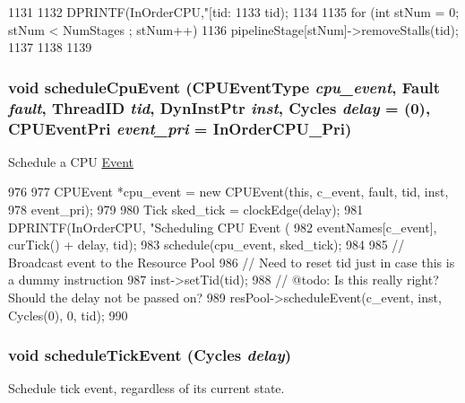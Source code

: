 \begin{DoxyCode}
1131 {
1132     DPRINTF(InOrderCPU,"[tid:%
1133             tid);
1134 
1135     for (int stNum = 0; stNum < NumStages ; stNum++) {
1136         pipelineStage[stNum]->removeStalls(tid);
1137     }
1138 
1139 }
\end{DoxyCode}
\hypertarget{classInOrderCPU_a7b7130cac388c6a2fd896ba0f6b7b87a}{
\subsubsection[{scheduleCpuEvent}]{\setlength{\rightskip}{0pt plus 5cm}void scheduleCpuEvent ({\bf CPUEventType} {\em cpu\_\-event}, \/  {\bf Fault} {\em fault}, \/  {\bf ThreadID} {\em tid}, \/  {\bf DynInstPtr} {\em inst}, \/  {\bf Cycles} {\em delay} = {(0)}, \/  {\bf CPUEventPri} {\em event\_\-pri} = {\ttfamily InOrderCPU\_\-Pri})}}
\label{classInOrderCPU_a7b7130cac388c6a2fd896ba0f6b7b87a}
Schedule a CPU \hyperlink{classEvent}{Event} 


\begin{DoxyCode}
976 {
977     CPUEvent *cpu_event = new CPUEvent(this, c_event, fault, tid, inst,
978                                        event_pri);
979 
980     Tick sked_tick = clockEdge(delay);
981     DPRINTF(InOrderCPU, "Scheduling CPU Event (%
982             eventNames[c_event], curTick() + delay, tid);
983     schedule(cpu_event, sked_tick);
984 
985     // Broadcast event to the Resource Pool
986     // Need to reset tid just in case this is a dummy instruction
987     inst->setTid(tid);        
988     // @todo: Is this really right? Should the delay not be passed on?
989     resPool->scheduleEvent(c_event, inst, Cycles(0), 0, tid);
990 }
\end{DoxyCode}
\hypertarget{classInOrderCPU_a71eb9ea7b25032de341033111b946dfc}{
\subsubsection[{scheduleTickEvent}]{\setlength{\rightskip}{0pt plus 5cm}void scheduleTickEvent ({\bf Cycles} {\em delay})}}
\label{classInOrderCPU_a71eb9ea7b25032de341033111b946dfc}
Schedule tick event, regardless of its current state. 


